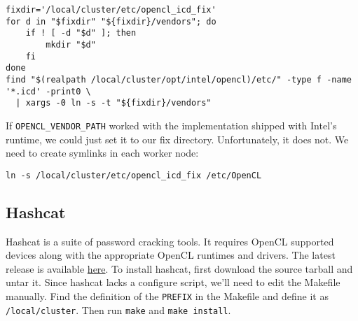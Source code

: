 \documentclass[]{book}
\begin{document}
\begin{verbatim}
fixdir='/local/cluster/etc/opencl_icd_fix'
for d in "$fixdir" "${fixdir}/vendors"; do
    if ! [ -d "$d" ]; then
        mkdir "$d"
    fi
done
find "$(realpath /local/cluster/opt/intel/opencl)/etc/" -type f -name '*.icd' -print0 \
  | xargs -0 ln -s -t "${fixdir}/vendors"
\end{verbatim}

If \texttt{OPENCL\_VENDOR\_PATH} worked with the implementation shipped
with Intel's runtime, we could just set it to our fix directory.
Unfortunately, it does not. We need to create symlinks in each worker
node:

\begin{verbatim}
ln -s /local/cluster/etc/opencl_icd_fix /etc/OpenCL
\end{verbatim}

\subsection{Hashcat}\label{hashcat}

Hashcat is a suite of password cracking tools. It requires OpenCL
supported devices along with the appropriate OpenCL runtimes and
drivers. The latest release is available
\href{https://hashcat.net/hashcat/}{here}. To install hashcat, first
download the source tarball and untar it. Since hashcat lacks a
configure script, we'll need to edit the Makefile manually. Find the
definition of the \texttt{PREFIX} in the Makefile and define it as
\texttt{/local/cluster}. Then run \texttt{make} and
\texttt{make\ install}.


\end{document}
